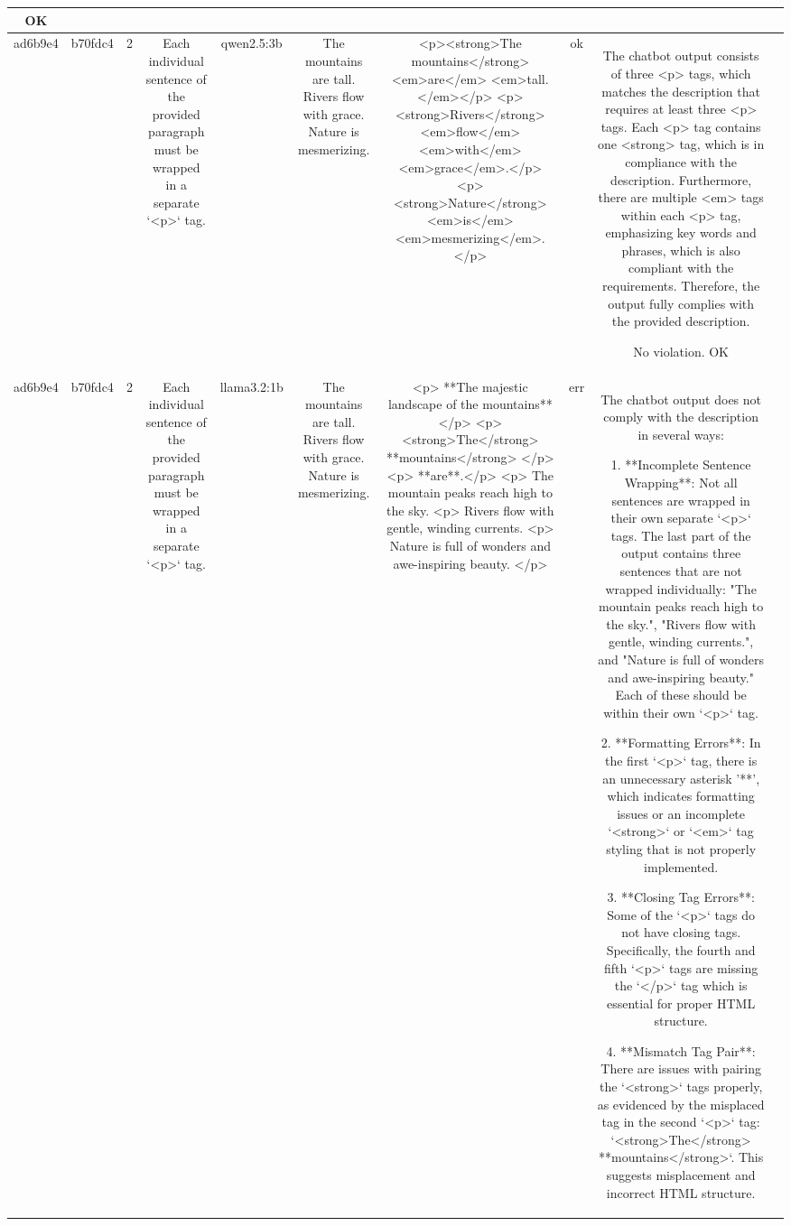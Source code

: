 \begin{table}[h!]
\begin{tabular}{|c|c|c|c|c|c|c|c|c|c|}
OK & \\
\hline
ad6b9e4 & b70fdc4 & 2 & Each individual sentence of the provided paragraph must be wrapped in a separate `<p>` tag. & qwen2.5:3b & The mountains are tall. Rivers flow with grace. Nature is mesmerizing. & <p><strong>The mountains</strong> <em>are</em> <em>tall.</em></p>
<p><strong>Rivers</strong> <em>flow</em> <em>with</em> <em>grace</em>.</p>
<p><strong>Nature</strong> <em>is</em> <em>mesmerizing</em>.</p> & ok & The chatbot output consists of three <p> tags, which matches the description that requires at least three <p> tags. Each <p> tag contains one <strong> tag, which is in compliance with the description. Furthermore, there are multiple <em> tags within each <p> tag, emphasizing key words and phrases, which is also compliant with the requirements. Therefore, the output fully complies with the provided description. 

No violation. 
OK & \\
\hline
ad6b9e4 & b70fdc4 & 2 & Each individual sentence of the provided paragraph must be wrapped in a separate `<p>` tag. & llama3.2:1b & The mountains are tall. Rivers flow with grace. Nature is mesmerizing. & <p> **The majestic landscape of the mountains** </p>
<p> <strong>The</strong> **mountains</strong> </p>
<p> **are**.</p>
<p> The mountain peaks reach high to the sky.
<p> Rivers flow with gentle, winding currents.
<p> Nature is full of wonders and awe-inspiring beauty. </p> & err & The chatbot output does not comply with the description in several ways:

1. **Incomplete Sentence Wrapping**: Not all sentences are wrapped in their own separate `<p>` tags. The last part of the output contains three sentences that are not wrapped individually: "The mountain peaks reach high to the sky.", "Rivers flow with gentle, winding currents.", and "Nature is full of wonders and awe-inspiring beauty." Each of these should be within their own `<p>` tag.

2. **Formatting Errors**: In the first `<p>` tag, there is an unnecessary asterisk '**', which indicates formatting issues or an incomplete `<strong>` or `<em>` tag styling that is not properly implemented.

3. **Closing Tag Errors**: Some of the `<p>` tags do not have closing tags. Specifically, the fourth and fifth `<p>` tags are missing the `</p>` tag which is essential for proper HTML structure.

4. **Mismatch Tag Pair**: There are issues with pairing the `<strong>` tags properly, as evidenced by the misplaced tag in the second `<p>` tag: `<strong>The</strong> **mountains</strong>`. This suggests misplacement and incorrect HTML structure.


\end{tabular}
\end{table}
